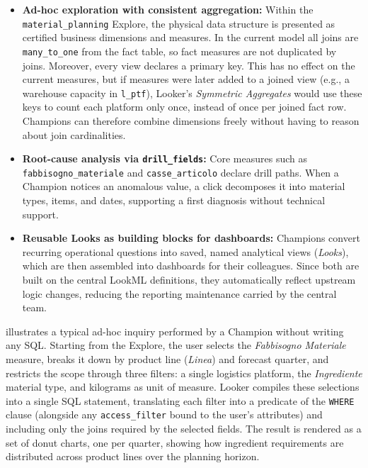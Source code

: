 \begin{itemize}
    \item \textbf{Ad-hoc exploration with consistent aggregation:} Within the \texttt{material\_\allowbreak planning} Explore, the physical data structure is presented as certified business dimensions and measures. In the current model all joins are \texttt{many\_to\_one} from the fact table, so fact measures are not duplicated by joins. Moreover, every view declares a primary key. This has no effect on the current measures, but if measures were later added to a joined view (e.g., a warehouse capacity in \texttt{l\_ptf}), Looker's \textit{Symmetric Aggregates} would use these keys to count each platform only once, instead of once per joined fact row. Champions can therefore combine dimensions freely without having to reason about join cardinalities.
    \item \textbf{Root-cause analysis via \texttt{drill\_fields}:} Core measures such as \texttt{fabbisogno\_\allowbreak materiale} and \texttt{casse\_articolo} declare drill paths. When a Champion notices an anomalous value, a click decomposes it into material types, items, and dates, supporting a first diagnosis without technical support.
    \item \textbf{Reusable Looks as building blocks for dashboards:} Champions convert recurring operational questions into saved, named analytical views (\textit{Looks}), which are then assembled into dashboards for their colleagues. Since both are built on the central LookML definitions, they automatically reflect upstream logic changes, reducing the reporting maintenance carried by the central team.
\end{itemize}

 illustrates a typical ad-hoc inquiry performed by a Champion without writing any SQL. Starting from the Explore, the user selects the \textit{Fabbisogno Materiale} measure, breaks it down by product line (\textit{Linea}) and forecast quarter, and restricts the scope through three filters: a single logistics platform, the \textit{Ingrediente} material type, and kilograms as unit of measure. Looker compiles these selections into a single SQL statement, translating each filter into a predicate of the \texttt{WHERE} clause (alongside any \texttt{access\_filter} bound to the user's attributes) and including only the joins required by the selected fields. The result is rendered as a set of donut charts, one per quarter, showing how ingredient requirements are distributed across product lines over the planning horizon.

